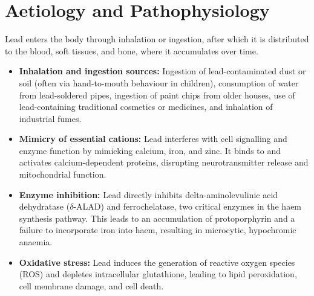 \section*{Aetiology and Pathophysiology}
Lead enters the body through inhalation or ingestion, after which it is distributed to the blood, soft tissues, and bone, where it accumulates over time.
\begin{itemize}
    \item \textbf{Inhalation and ingestion sources:} Ingestion of lead-contaminated dust or soil (often via hand-to-mouth behaviour in children), consumption of water from lead-soldered pipes, ingestion of paint chips from older houses, use of lead-containing traditional cosmetics or medicines, and inhalation of industrial fumes.
    \item \textbf{Mimicry of essential cations:} Lead interferes with cell signalling and enzyme function by mimicking calcium, iron, and zinc. It binds to and activates calcium-dependent proteins, disrupting neurotransmitter release and mitochondrial function.
    \item \textbf{Enzyme inhibition:} Lead directly inhibits delta-aminolevulinic acid dehydratase ($\delta$-ALAD) and ferrochelatase, two critical enzymes in the haem synthesis pathway. This leads to an accumulation of protoporphyrin and a failure to incorporate iron into haem, resulting in microcytic, hypochromic anaemia.
    \item \textbf{Oxidative stress:} Lead induces the generation of reactive oxygen species (ROS) and depletes intracellular glutathione, leading to lipid peroxidation, cell membrane damage, and cell death.
\end{itemize}

